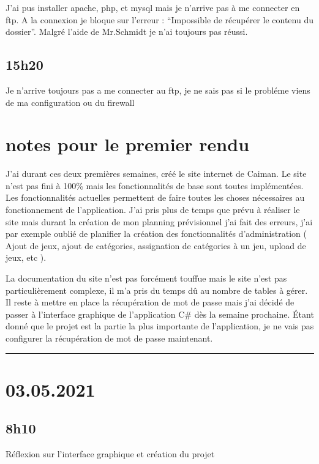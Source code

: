 \documentclass[a4paper,12pt,french]{sphinxmanual}
\begin{document}
\sphinxAtStartPar
J’ai pus installer apache, php, et mysql mais je n’arrive pas à me connecter en ftp. A la connexion je bloque sur l’erreur : “Impossible de récupérer le contenu du dossier”. Malgré l’aide de Mr.Schmidt je n’ai toujours pas réussi.


\subsection{15h20}
\label{\detokenize{logbook:id58}}
\sphinxAtStartPar
Je n’arrive toujours pas a me connecter au ftp, je ne sais pas si le probléme viens de ma configuration ou du firewall


\section{notes pour le premier rendu}
\label{\detokenize{logbook:notes-pour-le-premier-rendu}}
\sphinxAtStartPar
J’ai durant ces deux premières semaines, créé le site internet de Caiman. Le site n’est pas fini à 100\% mais les fonctionnalités de base sont toutes implémentées. Les fonctionnalités actuelles permettent de faire toutes les choses nécessaires au fonctionnement de l’application. J’ai pris plus de temps que prévu à réaliser le site mais durant la création de mon planning prévisionnel j’ai fait des erreurs, j’ai par exemple oublié de planifier la création des fonctionnalités d’administration ( Ajout de jeux, ajout de catégories, assignation de catégories à un jeu, upload de jeux, etc ).

\sphinxAtStartPar
La documentation du site n’est pas forcément touffue mais le site n’est pas particulièrement complexe, il m’a pris du temps dû au nombre de tables à gérer. Il reste à mettre en place la récupération de mot de passe mais j’ai décidé de passer à l’interface graphique de l’application C\# dès la semaine prochaine. Étant donné que le projet est la partie la plus importante de l’application, je ne vais pas configurer la récupération de mot de passe maintenant.


\bigskip\hrule\bigskip



\section{03.05.2021}
\label{\detokenize{logbook:id59}}

\subsection{8h10}
\label{\detokenize{logbook:id60}}
\sphinxAtStartPar
Réflexion sur l’interface graphique et création du projet
\end{document}
